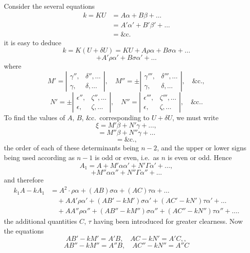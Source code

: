 \documentclass[11pt,a4paper]{book}
\begin{document}
Consider the several equations
\begin{align*}
k = KU &= A\alpha + B\beta + \ldots \\
&= A'\alpha' + B'\beta' + \ldots \\
&= \&\text{c.}
\end{align*}
it is easy to deduce
\[
k = K(U+\delta U) = KU + A\rho\alpha + B\sigma\alpha + \ldots
\]
\[
+ A'\rho\alpha' + B\sigma\alpha' + \ldots
\]
where
\[
M' = \left|\begin{array}{cc}
\gamma'', & \delta'', \ldots \\
\gamma, & \delta, \ldots
\end{array}\right|, \quad
M'' = \pm\left|\begin{array}{cc}
\gamma''', & \delta''', \ldots \\
\gamma, & \delta, \ldots
\end{array}\right|, \quad \&\text{c.}
\tag{72},
\]
\[
N' = \pm\left|\begin{array}{cc}
\epsilon'', & \zeta'', \ldots \\
\epsilon, & \zeta, \ldots
\end{array}\right|, \quad
N'' = \left|\begin{array}{cc}
\epsilon''', & \zeta''', \ldots \\
\epsilon, & \zeta, \ldots
\end{array}\right|, \quad \&\text{c.}
\tag{73}.
\]
To find the values of $A$, $B$, \&c.\ corresponding to $U+\delta U$, we must write
\[
\xi = M'\beta + N'\gamma + \ldots
\tag{74},
\]
\[
= M''\beta + N''\gamma + \ldots
\]
\[
= \&\text{c.}
\tag{75},
\]
the order of each of these determinants being $n-2$, and the upper or lower signs
being used according as $n-1$ is odd or even, i.e.\ as $n$ is even or odd. Hence
\[
A_1 = A + M'\alpha\alpha' + N'\Gamma\alpha' + \ldots
\tag{76},
\]
\[
+ M''\alpha\alpha'' + N''\Gamma\alpha'' + \ldots
\]
and therefore
\begin{align*}
k_1A - kA_1 &= A^2\cdot\rho\alpha + (AB)\sigma\alpha + (AC)\tau\alpha + \ldots \\
&\quad + AA'\rho\alpha' + (AB' - kM')\sigma\alpha' + (AC' - kN')\tau\alpha' + \ldots \\
&\quad + AA''\rho\alpha'' + (AB'' - kM'')\sigma\alpha'' + (AC'' - kN'')\tau\alpha'' + \ldots
\tag{77}.
\end{align*}
the additional quantities $C$, $\tau$ having been introduced for greater clearness. Now the
equations
\[
AB' - kM' = A'B, \quad AC - kN' = A'C, \tag{78},
\]
\[
AB'' - kM'' = A''B, \quad AC'' - kN'' = A''C
\]
\end{document}
